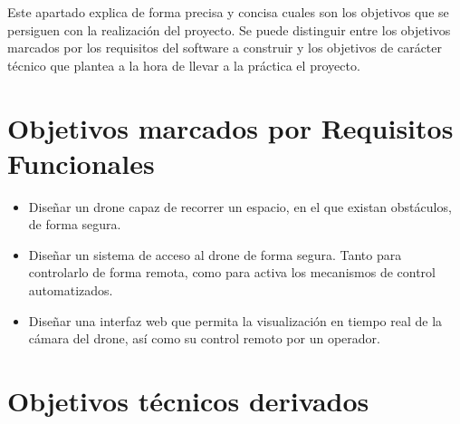
Este apartado explica de forma precisa y concisa cuales son los objetivos que se persiguen con la realización del proyecto. Se puede distinguir entre los objetivos marcados por los requisitos del software a construir y los objetivos de carácter técnico que plantea a la hora de llevar a la práctica el proyecto.

\section{Objetivos marcados por Requisitos Funcionales}

\begin{itemize}
\item Diseñar un drone capaz de recorrer un espacio, en el que existan obstáculos, de forma segura.
\item Diseñar un sistema de acceso al drone de forma segura. Tanto para controlarlo de forma remota, como para activa los mecanismos de control automatizados.
\item Diseñar una interfaz web que permita la visualización en tiempo real de la cámara del drone, así como su control remoto por un operador.
\end{itemize}


\section{Objetivos técnicos derivados}

